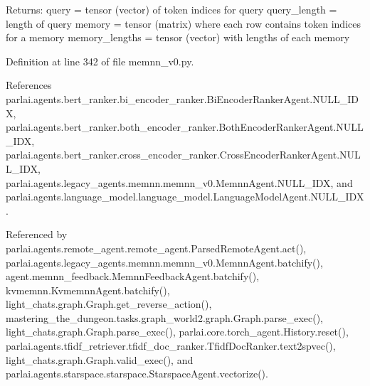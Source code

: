 \begin{DoxyVerb}Returns:
    query = tensor (vector) of token indices for query
    query_length = length of query
    memory = tensor (matrix) where each row contains token indices for a memory
    memory_lengths = tensor (vector) with lengths of each memory
\end{DoxyVerb}
 

Definition at line 342 of file memnn\+\_\+v0.\+py.



References parlai.\+agents.\+bert\+\_\+ranker.\+bi\+\_\+encoder\+\_\+ranker.\+Bi\+Encoder\+Ranker\+Agent.\+N\+U\+L\+L\+\_\+\+I\+DX, parlai.\+agents.\+bert\+\_\+ranker.\+both\+\_\+encoder\+\_\+ranker.\+Both\+Encoder\+Ranker\+Agent.\+N\+U\+L\+L\+\_\+\+I\+DX, parlai.\+agents.\+bert\+\_\+ranker.\+cross\+\_\+encoder\+\_\+ranker.\+Cross\+Encoder\+Ranker\+Agent.\+N\+U\+L\+L\+\_\+\+I\+DX, parlai.\+agents.\+legacy\+\_\+agents.\+memnn.\+memnn\+\_\+v0.\+Memnn\+Agent.\+N\+U\+L\+L\+\_\+\+I\+DX, and parlai.\+agents.\+language\+\_\+model.\+language\+\_\+model.\+Language\+Model\+Agent.\+N\+U\+L\+L\+\_\+\+I\+DX.



Referenced by parlai.\+agents.\+remote\+\_\+agent.\+remote\+\_\+agent.\+Parsed\+Remote\+Agent.\+act(), parlai.\+agents.\+legacy\+\_\+agents.\+memnn.\+memnn\+\_\+v0.\+Memnn\+Agent.\+batchify(), agent.\+memnn\+\_\+feedback.\+Memnn\+Feedback\+Agent.\+batchify(), kvmemnn.\+Kvmemnn\+Agent.\+batchify(), light\+\_\+chats.\+graph.\+Graph.\+get\+\_\+reverse\+\_\+action(), mastering\+\_\+the\+\_\+dungeon.\+tasks.\+graph\+\_\+world2.\+graph.\+Graph.\+parse\+\_\+exec(), light\+\_\+chats.\+graph.\+Graph.\+parse\+\_\+exec(), parlai.\+core.\+torch\+\_\+agent.\+History.\+reset(), parlai.\+agents.\+tfidf\+\_\+retriever.\+tfidf\+\_\+doc\+\_\+ranker.\+Tfidf\+Doc\+Ranker.\+text2spvec(), light\+\_\+chats.\+graph.\+Graph.\+valid\+\_\+exec(), and parlai.\+agents.\+starspace.\+starspace.\+Starspace\+Agent.\+vectorize().

